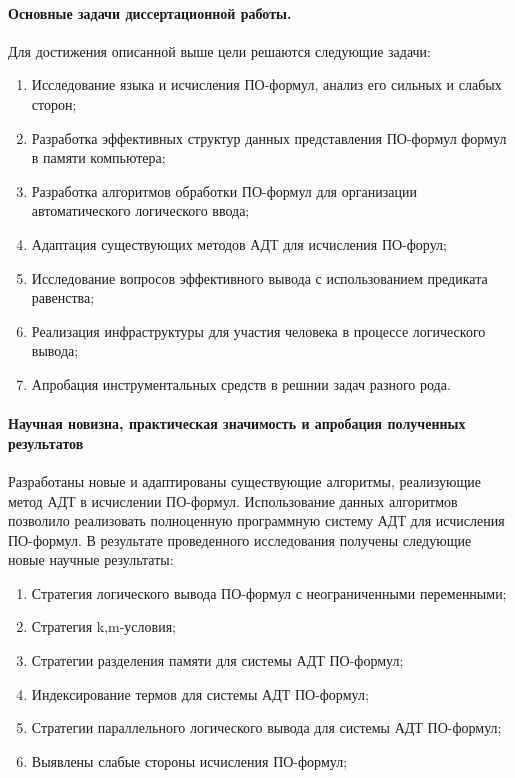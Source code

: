 \paragraph{Основные задачи диссертационной работы.} Для достижения описанной выше цели решаются следующие задачи:
\begin{enumerate}
\item Исследование языка и исчисления ПО-формул, анализ его сильных и слабых сторон;
\item Разработка эффективных структур данных представления ПО-формул формул в памяти компьютера;
\item Разработка алгоритмов обработки ПО-формул для организации автоматического логического ввода;
\item Адаптация существующих методов АДТ для исчисления ПО-форул;
\item Исследование вопросов эффективного вывода с использованием предиката равенства;
\item Реализация инфраструктуры для участия человека в процессе логического вывода;
\item Апробация инструментальных средств в решнии задач разного рода.
\end{enumerate}

\paragraph{Научная новизна, практическая значимость и апробация полученных результатов}
Разработаны новые и адаптированы существующие алгоритмы, реализующие метод АДТ в исчислении ПО-формул. Использование данных алгоритмов позволило реализовать полноценную программную систему АДТ для исчисления ПО-формул. В результате проведенного исследования получены следующие новые научные результаты:
\begin{enumerate}
\item Стратегия логического вывода ПО-формул с неограниченными переменными;
\item Стратегия k,m-условия;
\item Стратегии разделения памяти для системы АДТ ПО-формул;
\item Индексирование термов для системы АДТ ПО-формул;
\item Стратегии параллельного логического вывода для системы АДТ ПО-формул;
\item Выявлены слабые стороны исчисления ПО-формул;
\end{enumerate}

